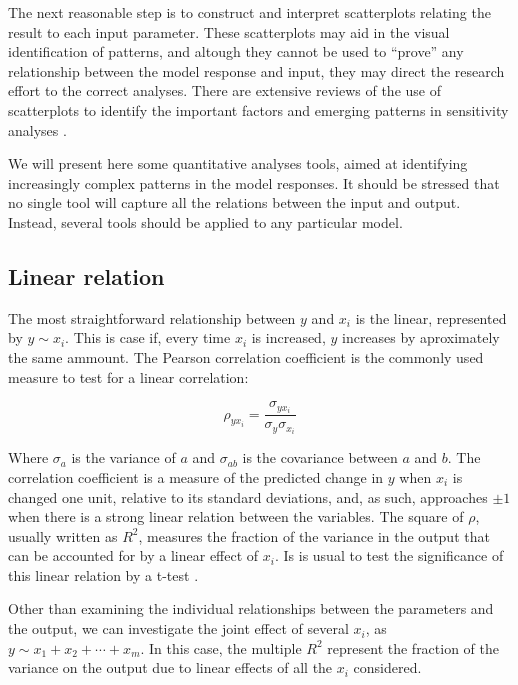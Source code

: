 The next reasonable step is to construct and interpret scatterplots relating
the result to each input parameter. These scatterplots may aid in the visual
identification of patterns, and altough they cannot be used to ``prove'' 
any relationship between the model response and input, they may direct the
research effort to the correct analyses. There are extensive reviews of the
use of scatterplots to identify the important factors and emerging patterns
in sensitivity analyses \cite{Kleijnen99}.

We will present here some quantitative analyses tools, aimed at identifying
increasingly complex patterns in the model responses. It should be stressed
that no single tool will capture all the relations between the input and
output. Instead, several tools should be applied to any particular model.

\subsection{Linear relation}\label{linear}
The most straightforward relationship between $y$ and $x_i$ is the linear, 
represented by $y \sim x_i$. This is case if, every time $x_i$ is increased, 
$y$ increases by aproximately the same ammount.
The Pearson correlation coefficient is the commonly used measure to test for
a linear correlation:

\begin{equation}
	\rho_{yx_i} = \frac{\sigma_{yx_i}}{\sigma_y\sigma_{x_i}}
	\label{PearsonRho}
\end{equation}

Where $\sigma_a$ is the variance of $a$ and $\sigma_{ab}$ is the covariance 
between $a$ and $b$. The correlation coefficient is a measure of the predicted
change in $y$ when $x_i$ is changed one unit, relative to its standard
deviations, and, as such, approaches $\pm 1$ when there is a strong
linear relation between the variables. The square of $\rho$, usually written as
$R^2$, measures the fraction of the variance in the output that can be accounted
for by a linear effect of $x_i$.
Is is usual to test the significance of this linear relation by a t-test 
\cite{estatisticabasica}.

Other than examining the individual relationships between the parameters and 
the output, we can investigate the joint effect of several $x_i$, as
$y \sim x_1 + x_2 + \cdots + x_m$. In this case, the multiple $R^2$ represent
the fraction of the variance on the output due to linear effects of all 
the $x_i$ considered.


